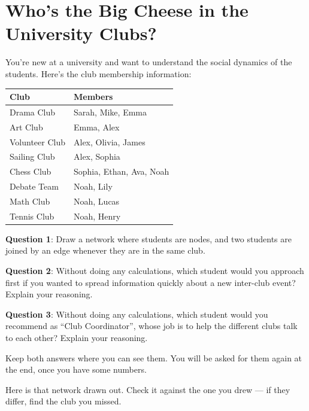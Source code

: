 \documentclass[a4paper, 14pt]{extarticle}
\begin{document}
\section*{\ppfont Who's the Big Cheese in the University Clubs?}

You're new at a university and want to understand the social dynamics of the
students. Here's the club membership information:

\begin{center}
\begin{tabular}{|l|l|}
    \hline
    \textbf{Club} & \textbf{Members} \\
    \hline
    Drama Club & Sarah, Mike, Emma \\
    Art Club & Emma, Alex \\
    Volunteer Club & Alex, Olivia, James \\
    Sailing Club & Alex, Sophia \\
    Chess Club & Sophia, Ethan, Ava, Noah \\
    Debate Team & Noah, Lily \\
    Math Club & Noah, Lucas \\
    Tennis Club & Noah, Henry \\
    \hline
\end{tabular}
\end{center}

{\bf Question 1}:
Draw a network where students are nodes, and two students are joined by an edge
whenever they are in the same club.

\clearpage

{\bf Question 2}:
Without doing any calculations, which student would you approach first if you
wanted to spread information quickly about a new inter-club event? Explain your
reasoning.

\vspace{9em}

{\bf Question 3}:
Without doing any calculations, which student would you recommend as ``Club
Coordinator'', whose job is to help the different clubs talk to each other?
Explain your reasoning.

\vspace{9em}

Keep both answers where you can see them. You will be asked for them again at
the end, once you have some numbers.

\clearpage

Here is that network drawn out. Check it against the one you drew --- if they
differ, find the club you missed.
\end{document}
